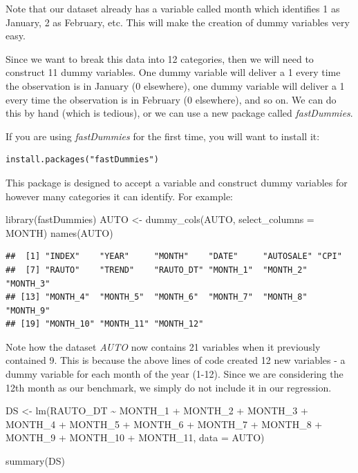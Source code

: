 \documentclass[
]{book}
\newenvironment{Shaded}{\begin{snugshade}}{\end{snugshade}}
\newcommand{\AttributeTok}[1]{\textcolor[rgb]{0.77,0.63,0.00}{#1}}
\newcommand{\FunctionTok}[1]{\textcolor[rgb]{0.00,0.00,0.00}{#1}}
\newcommand{\NormalTok}[1]{#1}
\newcommand{\OtherTok}[1]{\textcolor[rgb]{0.56,0.35,0.01}{#1}}
\newcommand{\SpecialCharTok}[1]{\textcolor[rgb]{0.00,0.00,0.00}{#1}}
\newcommand{\StringTok}[1]{\textcolor[rgb]{0.31,0.60,0.02}{#1}}
\begin{document}
Note that our dataset already has a variable called month which identifies 1 as January, 2 as February, etc. This will make the creation of dummy variables very easy.

Since we want to break this data into 12 categories, then we will need to construct 11 dummy variables. One dummy variable will deliver a 1 every time the observation is in January (0 elsewhere), one dummy variable will deliver a 1 every time the observation is in February (0 elsewhere), and so on. We can do this by hand (which is tedious), or we can use a new package called \emph{fastDummies}.

If you are using \emph{fastDummies} for the first time, you will want to install it:

\begin{verbatim}
install.packages("fastDummies")
\end{verbatim}

This package is designed to accept a variable and construct dummy variables for however many categories it can identify. For example:

\begin{Shaded}
\begin{Highlighting}[]
\FunctionTok{library}\NormalTok{(fastDummies)}
\NormalTok{AUTO }\OtherTok{\textless{}{-}} \FunctionTok{dummy\_cols}\NormalTok{(AUTO, }\AttributeTok{select\_columns =} \StringTok{\textquotesingle{}MONTH\textquotesingle{}}\NormalTok{)}
\FunctionTok{names}\NormalTok{(AUTO)}
\end{Highlighting}
\end{Shaded}

\begin{verbatim}
##  [1] "INDEX"    "YEAR"     "MONTH"    "DATE"     "AUTOSALE" "CPI"     
##  [7] "RAUTO"    "TREND"    "RAUTO_DT" "MONTH_1"  "MONTH_2"  "MONTH_3" 
## [13] "MONTH_4"  "MONTH_5"  "MONTH_6"  "MONTH_7"  "MONTH_8"  "MONTH_9" 
## [19] "MONTH_10" "MONTH_11" "MONTH_12"
\end{verbatim}

Note how the dataset \emph{AUTO} now contains 21 variables when it previously contained 9. This is because the above lines of code created 12 new variables - a dummy variable for each month of the year (1-12). Since we are considering the 12th month as our benchmark, we simply do not include it in our regression.

\begin{Shaded}
\begin{Highlighting}[]
\NormalTok{DS }\OtherTok{\textless{}{-}} \FunctionTok{lm}\NormalTok{(RAUTO\_DT }\SpecialCharTok{\textasciitilde{}}\NormalTok{ MONTH\_1 }\SpecialCharTok{+}\NormalTok{ MONTH\_2 }\SpecialCharTok{+}\NormalTok{ MONTH\_3 }\SpecialCharTok{+}\NormalTok{ MONTH\_4 }\SpecialCharTok{+}
\NormalTok{           MONTH\_5 }\SpecialCharTok{+}\NormalTok{ MONTH\_6 }\SpecialCharTok{+}\NormalTok{ MONTH\_7 }\SpecialCharTok{+}\NormalTok{ MONTH\_8 }\SpecialCharTok{+}\NormalTok{ MONTH\_9 }\SpecialCharTok{+}
\NormalTok{           MONTH\_10 }\SpecialCharTok{+}\NormalTok{ MONTH\_11, }\AttributeTok{data =}\NormalTok{ AUTO)}

\FunctionTok{summary}\NormalTok{(DS)}
\end{Highlighting}
\end{Shaded}
\end{document}
